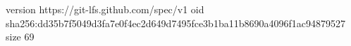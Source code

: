 version https://git-lfs.github.com/spec/v1
oid sha256:dd35b7f5049d3fa7e0f4ec2d649d7495fce3b1ba11b8690a4096f1ac94879527
size 69
